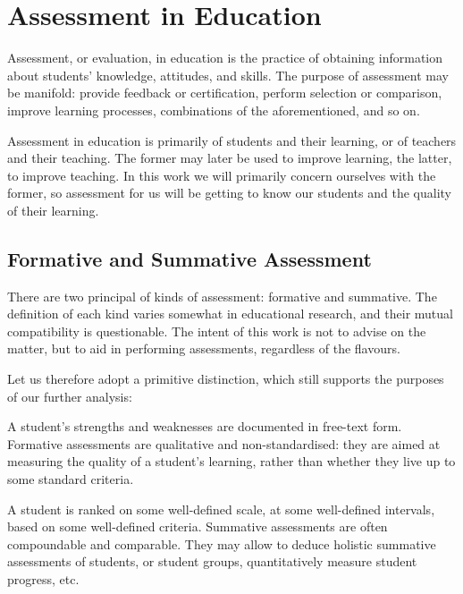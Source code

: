 
\section{Assessment in Education}


Assessment, or evaluation, in education is the practice of obtaining
information about students' knowledge, attitudes, and
skills\cite{assessment-and-burnout}.  The purpose of assessment may be
manifold: provide feedback or certification, perform selection or comparison,
improve learning processes, combinations of the aforementioned, and so
on\cite{first-ten-years}.

Assessment in education is primarily of students and their learning, or of
teachers and their teaching. The former may later be used to improve learning,
the latter, to improve teaching. In this work we will primarily concern
ourselves with the former, so assessment for us will be getting to know our
students and the quality of their learning\cite{ramsden1992}.

\subsection{Formative and Summative Assessment}

There are two principal of kinds of assessment: formative and summative. The
definition of each kind varies somewhat in educational research\cite{bloom1971,
sadler1989, formative-vs-summative}, and their mutual compatibility is
questionable\cite{butler1988}. The intent of this work is not to advise on the
matter, but to aid in performing assessments, regardless of the flavours.

Let us therefore adopt a primitive distinction, which still supports the
purposes of our further analysis:

\begin{description}[\setleftmargin{60pt}\setlabelstyle{\bf}]

\item[Formative] A student's strengths and weaknesses are documented in
free-text form. Formative assessments are qualitative and non-standard\-ised:
they are aimed at measuring the quality of a student's learning, rather than
whether they live up to some standard criteria. 

\item[Summative] A student is ranked on some well-defined scale, at some
well-defined intervals, based on some well-defined criteria. Summative
assessments are often compoundable and comparable. They may allow to deduce
holistic summative assessments of students, or student groups, quantitatively
measure student progress, etc.

\end{description}

